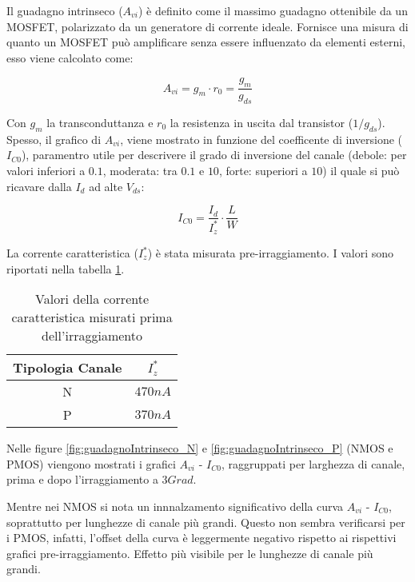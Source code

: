 Il guadagno intrinseco ($A_{vi}$) è definito come il massimo guadagno ottenibile da un MOSFET, polarizzato da un generatore di corrente ideale. Fornisce una misura di quanto un MOSFET può amplificare senza essere influenzato da elementi esterni, esso viene calcolato come:

$$A_{vi} = g_{m} \cdot r_0 = \frac{g_{m}}{g_{ds}} $$

Con $g_m$ la transconduttanza e $r_0$ la resistenza in uscita dal transistor (${1}/{g_{ds}}$). Spesso, il grafico di $A_{vi}$, viene mostrato in funzione del coefficente di inversione ($I_{C0}$), paramentro utile per descrivere il grado di inversione del canale (debole: per valori inferiori a $0.1$, moderata: tra $0.1$ e $10$, forte: superiori a $10$) il quale si può ricavare dalla $I_d$ ad alte $V_{ds}$:

$$I_{C0} = \frac{I_{d}}{I_{z}^{*}} \cdot \frac{L}{W}$$

La corrente caratteristica ($I_{z}^{*}$) è stata misurata pre-irraggiamento. I valori sono riportati nella tabella \ref{tab:corrente_caratteristica}.

\begin{table}[h!]
    \centering
    \begin{tabular}{c c}
        \toprule
        Tipologia Canale & $I_{z}^{*}$ \\
        \midrule
        N                & $470nA$     \\
        P                & $370nA$     \\
        \bottomrule
    \end{tabular}
    \caption{Valori della corrente caratteristica misurati prima dell'irraggiamento}
    \label{tab:corrente_caratteristica}
\end{table}


Nelle figure \ref{fig:guadagnoIntrinseco_N} e \ref{fig:guadagnoIntrinseco_P} (NMOS e PMOS) viengono mostrati i grafici $A_{vi}$ - $I_{C0}$, raggruppati per larghezza di canale, prima e dopo l'irraggiamento a $3Grad$.

Mentre nei NMOS si nota un innnalzamento significativo della curva $A_{vi}$ - $I_{C0}$, soprattutto per lunghezze di canale più grandi. Questo non sembra verificarsi per i PMOS, infatti, l'offset della curva è leggermente negativo rispetto ai rispettivi grafici pre-irraggiamento. Effetto più visibile per le lunghezze di canale più grandi.



